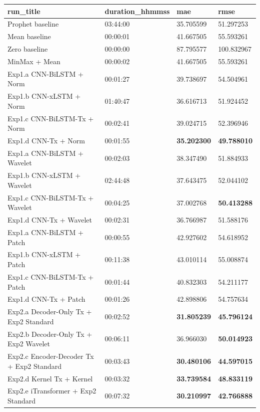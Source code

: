 \begin{tabular}{|l|l|l|l|}
    \hline
    \textbf{run\_title} & \textbf{duration\_hhmmss} & \textbf{mae} & \textbf{rmse} \\ \hline
    Prophet baseline & 03:44:00 & 35.705599 & 51.297253 \\ \hline
    Mean baseline & 00:00:01 & 41.667505 & 55.593261 \\ \hline
    Zero baseline & 00:00:00 & 87.795577 & 100.832967 \\ \hline
    MinMax + Mean & 00:00:02 & 41.667505 & 55.593261 \\ \hline
    Exp1.a CNN-BiLSTM + Norm & 00:01:27 & 39.738697 & 54.504961 \\ \hline
    Exp1.b CNN-xLSTM + Norm & 01:40:47 & 36.616713 & 51.924452 \\ \hline
    Exp1.c CNN-BiLSTM-Tx + Norm & 00:02:41 & 39.024715 & 52.396946 \\ \hline
    Exp1.d CNN-Tx + Norm & 00:01:55 & \textbf{35.202300} & \textbf{49.788010} \\ \hline
    Exp1.a CNN-BiLSTM + Wavelet & 00:02:03 & 38.347490 & 51.884933 \\ \hline
    Exp1.b CNN-xLSTM + Wavelet & 02:44:48 & 37.643475 & 52.044102 \\ \hline
    Exp1.c CNN-BiLSTM-Tx + Wavelet & 00:04:25 & 37.002768 & \textbf{50.413288} \\ \hline
    Exp1.d CNN-Tx + Wavelet & 00:02:31 & 36.766987 & 51.588176 \\ \hline
    Exp1.a CNN-BiLSTM + Patch & 00:00:55 & 42.927602 & 54.618952 \\ \hline
    Exp1.b CNN-xLSTM + Patch & 00:11:38 & 43.010114 & 55.008874 \\ \hline
    Exp1.c CNN-BiLSTM-Tx + Patch & 00:01:44 & 40.832303 & 54.211177 \\ \hline
    Exp1.d CNN-Tx + Patch & 00:01:26 & 42.898806 & 54.757634 \\ \hline
    Exp2.a Decoder-Only Tx + Exp2 Standard & 00:02:52 & \textbf{31.805239} & \textbf{45.796124} \\ \hline
    Exp2.b Decoder-Only Tx + Exp2 Wavelet & 00:06:11 & 36.966030 & \textbf{50.014923} \\ \hline
    Exp2.c Encoder-Decoder Tx + Exp2 Standard & 00:03:43 & \textbf{30.480106} & \textbf{44.597015} \\ \hline
    Exp2.d Kernel Tx + Kernel & 00:03:32 & \textbf{33.739584} & \textbf{48.833119} \\ \hline
    Exp2.e iTransformer + Exp2 Standard & 00:07:32 & \textbf{30.210997} & \textbf{42.766888} \\ \hline
\end{tabular}
\label{table:results}

